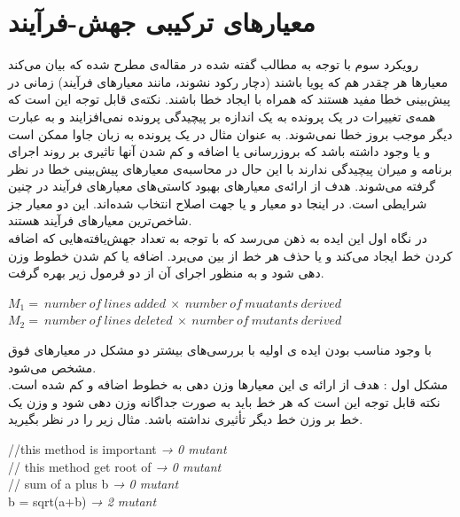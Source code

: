 \section{معیارهای ترکیبی جهش-فرآیند}
رویکرد سوم با توجه به مطالب گفته شده در مقاله‌ی \cite{rahman2013and} مطرح شده که بیان می‌کند معیارها هر چقدر هم که پویا باشند (دچار رکود نشوند، مانند معیارهای فرآیند) زمانی در پیش‌بینی خطا مفید هستند که همراه با ایجاد خطا باشند. نکته‌ی قابل توجه این است که همه‌ی تغییرات در یک پرونده به یک اندازه  بر پیچیدگی پرونده نمی‌افزایند و به عبارت دیگر موجب بروز خطا نمی‌شوند. به عنوان مثال در یک پرونده به زبان جاوا ممکن است  و یا  وجود داشته باشد که بروزرسانی یا اضافه و کم شدن آنها تاثیری بر روند اجرای برنامه و میران پیچیدگی ندارند با این حال در محاسبه‌ی معیارهای پیش‌بینی خطا در نظر گرفته می‌شوند. هدف از ارائه‌ی معیارهای  بهبود کاستی‌های معیارهای فرآیند در چنین شرایطی است. در اینجا دو معیار  و یا   جهت اصلاح انتخاب شده‌اند.  این دو معیار جز شاخص‌ترین معیارهای فرآیند هستند.\\
در نگاه اول  این ایده به ذهن می‌رسد که با توجه به تعداد جهش‌یافته‌هایی که  اضافه   کردن  خط ایجاد می‌کند و یا حذف هر خط  از بین می‌برد. اضافه یا کم شدن خطوط وزن دهی شود و به منظور اجرای آن از دو  فرمول زیر بهره گرفت.\\
\begin{latin}
	
	$M_1 =\ number\ of\ lines\ added\ \times \ number\ of\ muatants\ derived$\\
	
	$M_2 =\ number\ of\ lines\ deleted\ \times \ number\ of\ mutants\ derived$\\
\end{latin}


با وجود مناسب بودن ایده ی اولیه با بررسی‌های بیشتر دو مشکل در معیارهای فوق مشخص می‌شود.\\
مشکل اول : هدف از ارائه ی این معیارها وزن دهی به خطوط اضافه و کم شده است. نکته قابل توجه این است که هر خط باید به صورت جداگانه وزن دهی شود و وزن یک خط بر وزن خط دیگر تأثیری نداشته باشد. مثال زیر را در نظر بگیرید.
\begin{latin}
\flushleft
//this method is important  \emph{→ 0 mutant} \\
// this method get root of \emph{→ 0 mutant}\\
// sum of a plus b \emph{→ 0 mutant} \\ 
b = sqrt(a+b) \emph{→ 2 mutant} \\
\end{latin}

